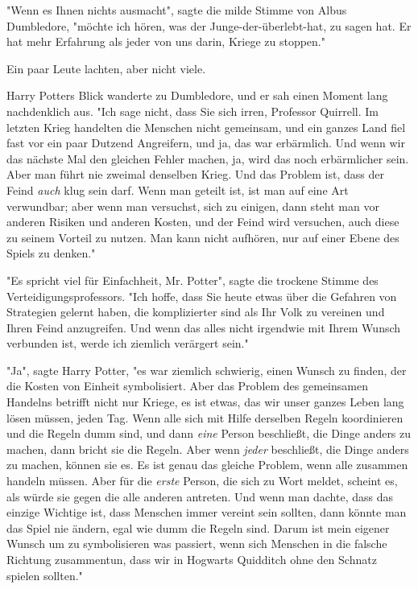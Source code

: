 {"Wenn es Ihnen nichts ausmacht", sagte die milde Stimme von Albus Dumbledore, "möchte ich hören, was der Junge-der-überlebt-hat, zu sagen hat. Er hat mehr Erfahrung als jeder von uns darin, Kriege zu stoppen."

Ein paar Leute lachten, aber nicht viele.

Harry Potters Blick wanderte zu Dumbledore, und er sah einen Moment lang nachdenklich aus. "Ich sage nicht, dass Sie sich irren, Professor Quirrell. Im letzten Krieg handelten die Menschen nicht gemeinsam, und ein ganzes Land fiel fast vor ein paar Dutzend Angreifern, und ja, das war erbärmlich. Und wenn wir das nächste Mal den gleichen Fehler machen, ja, wird das noch erbärmlicher sein. Aber man führt nie zweimal denselben Krieg. Und das Problem ist, dass der Feind \emph{auch} klug sein darf. Wenn man geteilt ist, ist man auf eine Art verwundbar; aber wenn man versuchst, sich zu einigen, dann steht man vor anderen Risiken und anderen Kosten, und der Feind wird versuchen, auch diese zu seinem Vorteil zu nutzen. Man kann nicht aufhören, nur auf einer Ebene des Spiels zu denken."

"Es spricht viel für Einfachheit, Mr. Potter", sagte die trockene Stimme des Verteidigungsprofessors. "Ich hoffe, dass Sie heute etwas über die Gefahren von Strategien gelernt haben, die komplizierter sind als Ihr Volk zu vereinen und Ihren Feind anzugreifen. Und wenn das alles nicht irgendwie mit Ihrem Wunsch verbunden ist, werde ich ziemlich verärgert sein."

"Ja", sagte Harry Potter, "es war ziemlich schwierig, einen Wunsch zu finden, der die Kosten von Einheit symbolisiert. Aber das Problem des gemeinsamen Handelns betrifft nicht nur Kriege, es ist etwas, das wir unser ganzes Leben lang lösen müssen, jeden Tag. Wenn alle sich mit Hilfe derselben Regeln koordinieren und die Regeln dumm sind, und dann \emph{eine} Person beschließt, die Dinge anders zu machen, dann bricht sie die Regeln. Aber wenn \emph{jeder} beschließt, die Dinge anders zu machen, können sie es. Es ist genau das gleiche Problem, wenn alle zusammen handeln müssen. Aber für die \emph{erste} Person, die sich zu Wort meldet, scheint es, als würde sie gegen die alle anderen antreten. Und wenn man dachte, dass das einzige Wichtige ist, dass Menschen immer vereint sein sollten, dann könnte man das Spiel nie ändern, egal wie dumm die Regeln sind. Darum ist mein eigener Wunsch um zu symbolisieren was passiert, wenn sich Menschen in die falsche Richtung zusammentun, dass wir in Hogwarts Quidditch ohne den Schnatz spielen sollten."

}
